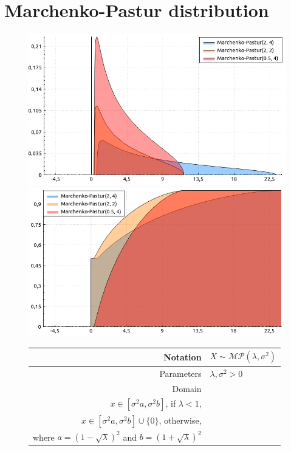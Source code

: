 \documentclass[a4paper,11pt]{article}
\theoremstyle{plain}
\theoremstyle{definition}
\begin{document}
	\section{Marchenko-Pastur distribution}
	\begin{figure}[!htb]\centering
		\begin{minipage}{0.55\textwidth}
			\includegraphics[width=\linewidth, right]{marchenko_pastur_pdf}
			\captionsetup{labelformat=empty}
			\includegraphics[width=\linewidth, right]{marchenko_pastur_cdf}
			\captionsetup{labelformat=empty}
		\end{minipage}
		\begin{minipage}{0.4\textwidth}
			\begin{tabular}{| r | l |}
				\hline
				Notation & $X \sim \mathcal{MP}(\lambda, \sigma^2)$ \\
				\hline
				Parameters & $\lambda, \sigma^2 > 0$ \\
				\hline
				Domain & 
				\pbox{\linewidth}{$ $ \\ $x \in [\sigma^2 a, \sigma^2 b]$, if  $\lambda < 1$, \\  $ x \in [\sigma^2 a, \sigma^2 b] \cup \{0\} $, otherwise, \\ where $a=(1-\sqrt{\lambda})^2$ and $b=(1+\sqrt{\lambda})^2$} \\

\end{tabular}
\end{minipage}
\end{figure}
\end{document}

